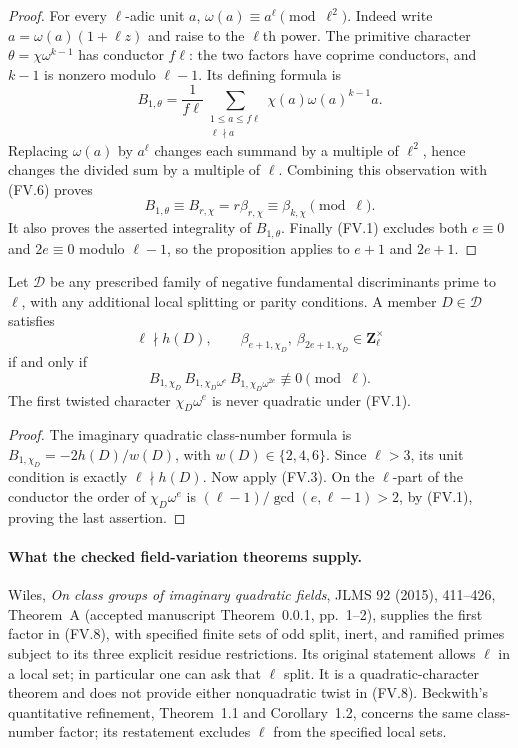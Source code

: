 \begin{proof}
For every $\ell$-adic unit $a$,
$\omega(a)\equiv a^\ell\pmod{\ell^2}$.  Indeed write
$a=\omega(a)(1+\ell z)$ and raise to the $\ell$th power.
The primitive character $\theta=\chi\omega^{k-1}$ has conductor
$f\ell$: the two factors have coprime conductors, and $k-1$ is
nonzero modulo $\ell-1$.  Its defining formula is
\[
 B_{1,\theta}=\frac1{f\ell}
       \sum_{\substack{1\leq a\leq f\ell\\\ell\nmid a}}
               \chi(a)\omega(a)^{k-1}a.
\]
Replacing $\omega(a)$ by $a^\ell$ changes each summand by a
multiple of $\ell^2$, hence changes the divided sum by a multiple
of $\ell$.  Combining this observation with (FV.6) proves
\[
 B_{1,\theta}\equiv B_{r,\chi}
       =r\beta_{r,\chi}\equiv\beta_{k,\chi}\pmod\ell.
\]
It also proves the asserted integrality of $B_{1,\theta}$.
Finally (FV.1) excludes both $e\equiv0$ and $2e\equiv0$
modulo $\ell-1$, so the proposition applies to $e+1$ and $2e+1$.
\end{proof}

\begin{corollary}
Let $\mathcal D$ be any prescribed family of negative fundamental
discriminants prime to $\ell$, with any additional local splitting
or parity conditions.  A member $D\in\mathcal D$ satisfies
\[
 \ell\nmid h(D),\qquad
 \beta_{e+1,\chi_D},\ \beta_{2e+1,\chi_D}\in\mathbf Z_\ell^\times
                                                               \tag{FV.7}
\]
if and only if
\[
 B_{1,\chi_D}\,B_{1,\chi_D\omega^e}\,
 B_{1,\chi_D\omega^{2e}}\not\equiv0\pmod\ell.               \tag{FV.8}
\]
The first twisted character $\chi_D\omega^e$ is never quadratic
under (FV.1).
\end{corollary}
\begin{proof}
The imaginary quadratic class-number formula is
$B_{1,\chi_D}=-2h(D)/w(D)$, with $w(D)\in\{2,4,6\}$.
Since $\ell>3$, its unit condition is exactly $\ell\nmid h(D)$.
Now apply (FV.3).  On the $\ell$-part of the conductor the order
of $\chi_D\omega^e$ is
$(\ell-1)/\gcd(e,\ell-1)>2$, by (FV.1), proving the last assertion.
\end{proof}

\paragraph{What the checked field-variation theorems supply.}
Wiles, \emph{On class groups of imaginary quadratic fields}, JLMS
92 (2015), 411--426, Theorem~A (accepted manuscript
Theorem~0.0.1, pp.~1--2), supplies the first factor in (FV.8),
with specified finite sets of odd split, inert, and ramified primes
subject to its three explicit residue restrictions.  Its original
statement allows $\ell$ in a local set; in particular one can ask
that $\ell$ split.  It is a quadratic-character theorem and does
not provide either nonquadratic twist in (FV.8).  Beckwith's
quantitative refinement, Theorem~1.1 and Corollary~1.2, concerns
the same class-number factor; its restatement excludes $\ell$
from the specified local sets.

